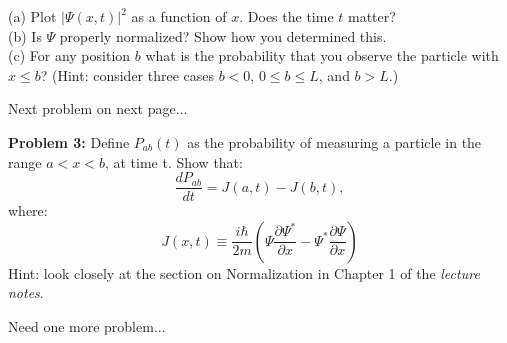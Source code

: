 \documentclass[12pt]{article}
\begin{document}
\noindent
(a) Plot $|\Psi(x,t)|^2$ as a function of $x$.  Does the time $t$ matter? \\[5pt]
(b) Is $\Psi$ properly normalized?  Show how you determined this.\\[5pt]
(c) For any position $b$ what is the probability that you observe the particle with $x \leq b$?  (Hint: consider three cases $b<0$, $0 \leq b \leq L$, and $b > L$.)


\vskip 1cm
\begin{center}
Next problem on next page...
\end{center}


\newpage
\noindent
    {\bf Problem 3:} Define $P_{ab}(t)$ as the probability of measuring a particle in the range $a< x < b$, at time t.  Show that:
\begin{displaymath}
  \frac{dP_{ab}}{dt} = J(a, t) - J(b, t),
\end{displaymath}
where:
\begin{displaymath}
  J(x, t) \equiv \frac{i \hbar}{2m}
  \left( \Psi \frac{\partial \Psi^*}{\partial x} - \Psi^* \frac{\partial \Psi}{\partial x}\right)
\end{displaymath}
Hint: look closely at the section on Normalization in Chapter 1 of the {\em lecture notes}.


Need one more problem...
\end{document}
